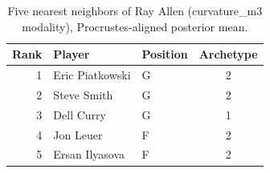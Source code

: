 \begin{table}[htbp]
  \centering\small
  \begin{tabular}{rllc}
    \toprule
    Rank & Player & Position & Archetype \\
    \midrule
    1 & Eric Piatkowski & G & 2 \\
    2 & Steve Smith & G & 2 \\
    3 & Dell Curry & G & 1 \\
    4 & Jon Leuer & F & 2 \\
    5 & Ersan Ilyasova & F & 2 \\
    \bottomrule
  \end{tabular}
  \caption{Five nearest neighbors of Ray Allen (curvature_m3 modality), Procrustes-aligned posterior mean.}
  \label{tab:Ray_Allen_neighbors_curvature_m3}
\end{table}


